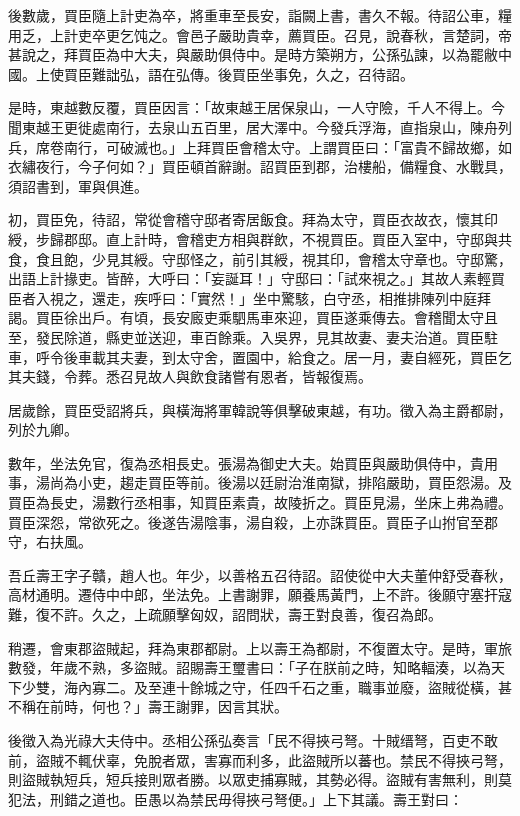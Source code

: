 \begin{pinyinscope}
後數歲，買臣隨上計吏為卒，將重車至長安，詣闕上書，書久不報。待詔公車，糧用乏，上計吏卒更乞饨之。會邑子嚴助貴幸，薦買臣。召見，說春秋，言楚詞，帝甚說之，拜買臣為中大夫，與嚴助俱侍中。是時方築朔方，公孫弘諫，以為罷敝中國。上使買臣難詘弘，語在弘傳。後買臣坐事免，久之，召待詔。

是時，東越數反覆，買臣因言：「故東越王居保泉山，一人守險，千人不得上。今聞東越王更徙處南行，去泉山五百里，居大澤中。今發兵浮海，直指泉山，陳舟列兵，席卷南行，可破滅也。」上拜買臣會稽太守。上謂買臣曰：「富貴不歸故鄉，如衣繡夜行，今子何如？」買臣頓首辭謝。詔買臣到郡，治樓船，備糧食、水戰具，須詔書到，軍與俱進。

初，買臣免，待詔，常從會稽守邸者寄居飯食。拜為太守，買臣衣故衣，懷其印綬，步歸郡邸。直上計時，會稽吏方相與群飲，不視買臣。買臣入室中，守邸與共食，食且飽，少見其綬。守邸怪之，前引其綬，視其印，會稽太守章也。守邸驚，出語上計掾吏。皆醉，大呼曰：「妄誕耳！」守邸曰：「試來視之。」其故人素輕買臣者入視之，還走，疾呼曰：「實然！」坐中驚駭，白守丞，相推排陳列中庭拜謁。買臣徐出戶。有頃，長安廄吏乘駟馬車來迎，買臣遂乘傳去。會稽聞太守且至，發民除道，縣吏並送迎，車百餘乘。入吳界，見其故妻、妻夫治道。買臣駐車，呼令後車載其夫妻，到太守舍，置園中，給食之。居一月，妻自經死，買臣乞其夫錢，令葬。悉召見故人與飲食諸嘗有恩者，皆報復焉。

居歲餘，買臣受詔將兵，與橫海將軍韓說等俱擊破東越，有功。徵入為主爵都尉，列於九卿。

數年，坐法免官，復為丞相長史。張湯為御史大夫。始買臣與嚴助俱侍中，貴用事，湯尚為小吏，趨走買臣等前。後湯以廷尉治淮南獄，排陷嚴助，買臣怨湯。及買臣為長史，湯數行丞相事，知買臣素貴，故陵折之。買臣見湯，坐床上弗為禮。買臣深怨，常欲死之。後遂告湯陰事，湯自殺，上亦誅買臣。買臣子山拊官至郡守，右扶風。

吾丘壽王字子贛，趙人也。年少，以善格五召待詔。詔使從中大夫董仲舒受春秋，高材通明。遷侍中中郎，坐法免。上書謝罪，願養馬黃門，上不許。後願守塞扞寇難，復不許。久之，上疏願擊匈奴，詔問狀，壽王對良善，復召為郎。

稍遷，會東郡盜賊起，拜為東郡都尉。上以壽王為都尉，不復置太守。是時，軍旅數發，年歲不熟，多盜賊。詔賜壽王璽書曰：「子在朕前之時，知略輻湊，以為天下少雙，海內寡二。及至連十餘城之守，任四千石之重，職事並廢，盜賊從橫，甚不稱在前時，何也？」壽王謝罪，因言其狀。

後徵入為光祿大夫侍中。丞相公孫弘奏言「民不得挾弓弩。十賊缙弩，百吏不敢前，盜賊不輒伏辜，免脫者眾，害寡而利多，此盜賊所以蕃也。禁民不得挾弓弩，則盜賊執短兵，短兵接則眾者勝。以眾吏捕寡賊，其勢必得。盜賊有害無利，則莫犯法，刑錯之道也。臣愚以為禁民毋得挾弓弩便。」上下其議。壽王對曰：


\end{pinyinscope}
